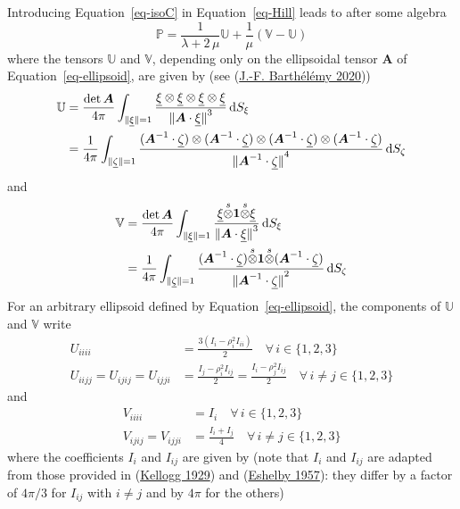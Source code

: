 \documentclass[
  letterpaper,
  DIV=11,
  numbers=noendperiod]{scrreprt}
\begin{document}
Introducing Equation~\ref{eq-isoC} in Equation~\ref{eq-Hill} leads to
after some algebra \[
{\mathbb{{P}}}=
\frac{1}{\lambda+2\,\mu}
{\mathbb{{U}}}
+\frac{1}{\mu}({\mathbb{{V}}}-{\mathbb{{U}}})
\] where the tensors \({\mathbb{{U}}}\) and \({\mathbb{{V}}}\),
depending only on the ellipsoidal tensor \({\mathbf{\boldsymbol{{A}}}}\)
of Equation~\ref{eq-ellipsoid}, are given by (see
(\protect\hyperlink{ref-barthelemy2020}{J.-F. Barthélémy 2020}))
\[\begin{aligned}
{\mathbb{{U}}} &= \frac{\det{{\mathbf{\boldsymbol{{A}}}}}}{4\pi}
\int_{{\lVert{{{\underline{{\xi}}}}}\rVert}=1}
\frac{{\underline{{\xi}}}\otimes{\underline{{\xi}}}\otimes{\underline{{\xi}}}\otimes{\underline{{\xi}}}}
{{\lVert{{{\mathbf{\boldsymbol{{A}}}}\cdot{\underline{{\xi}}}}}\rVert}^3}{\,\mathrm{d}}S_{\xi}\\
&=
\frac{1}{4\pi}
\int_{{\lVert{{{\underline{{\zeta}}}}}\rVert}=1}
\frac{%
({\mathbf{\boldsymbol{{A}}}}^{-1}\cdot{\underline{{\zeta}}})
\otimes
({\mathbf{\boldsymbol{{A}}}}^{-1}\cdot{\underline{{\zeta}}})
\otimes
({\mathbf{\boldsymbol{{A}}}}^{-1}\cdot{\underline{{\zeta}}})
\otimes
({\mathbf{\boldsymbol{{A}}}}^{-1}\cdot{\underline{{\zeta}}})
}{{\lVert{{{\mathbf{\boldsymbol{{A}}}}^{-1}\cdot{\underline{{\zeta}}}}}\rVert}^4}
{\,\mathrm{d}}S_{\zeta}
\end{aligned}\] and \[\begin{aligned}
{\mathbb{{V}}} &= \frac{\det{{\mathbf{\boldsymbol{{A}}}}}}{4\pi}
\int_{{\lVert{{{\underline{{\xi}}}}}\rVert}=1}
\frac{{\underline{{\xi}}}{\stackrel{s}{\otimes}}{\mathbf{\boldsymbol{{1}}}}{\stackrel{s}{\otimes}}{\underline{{\xi}}}}
{{\lVert{{{\mathbf{\boldsymbol{{A}}}}\cdot{\underline{{\xi}}}}}\rVert}^3}{\,\mathrm{d}}S_{\xi}\\
&=
\frac{1}{4\pi}
\int_{{\lVert{{{\underline{{\zeta}}}}}\rVert}=1}
\frac{%
({\mathbf{\boldsymbol{{A}}}}^{-1}\cdot{\underline{{\zeta}}})
{\stackrel{s}{\otimes}}
{\mathbf{\boldsymbol{{1}}}}
{\stackrel{s}{\otimes}}
({\mathbf{\boldsymbol{{A}}}}^{-1}\cdot{\underline{{\zeta}}})
}{{\lVert{{{\mathbf{\boldsymbol{{A}}}}^{-1}\cdot{\underline{{\zeta}}}}}\rVert}^2}
{\,\mathrm{d}}S_{\zeta}
\end{aligned}\] For an arbitrary ellipsoid defined by
Equation~\ref{eq-ellipsoid}, the components of \({\mathbb{{U}}}\) and
\({\mathbb{{V}}}\) write \[\begin{aligned}
U_{iiii}&=\frac{3(I_i-\rho_i^2I_{ii})}{2} 
\quad\forall\, i\in\{1,2,3\}\\
U_{iijj}=U_{ijij}=U_{ijji}&=\frac{I_j-\rho_i^2I_{ij}}{2} 
=\frac{I_i-\rho_j^2I_{ij}}{2}
\quad\forall\, i\neq j\in\{1,2,3\}
\end{aligned}\] and \[\begin{aligned}
V_{iiii}&=I_i\quad\forall\, i\in\{1,2,3\}\\
V_{ijij}=V_{ijji}&=\frac{I_i+I_j}{4}
\quad\forall\, i\neq j\in\{1,2,3\}
\end{aligned}\] where the coefficients \(I_i\) and \(I_{ij}\) are given
by (note that \(I_i\) and \(I_{ij}\) are adapted from those provided in
(\protect\hyperlink{ref-kellogg1929}{Kellogg 1929}) and
(\protect\hyperlink{ref-eshelby1957}{Eshelby 1957}): they differ by a
factor of \(4\pi/3\) for \(I_{ij}\) with \(i\neq j\) and by \(4\pi\) for
the others)
\end{document}
